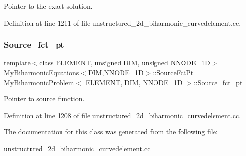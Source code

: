 Pointer to the exact solution. 



Definition at line 1211 of file unstructured\+\_\+2d\+\_\+biharmonic\+\_\+curvedelement.\+cc.

\mbox{\label{classMyBiharmonicProblem_a1ba6c64955d32e319db7a7de7807458a}} 
\subsubsection{\texorpdfstring{Source\+\_\+fct\+\_\+pt}{Source\_fct\_pt}}
{\footnotesize\ttfamily template$<$class E\+L\+E\+M\+E\+NT, unsigned D\+IM, unsigned N\+N\+O\+D\+E\+\_\+1D$>$ \\
\hyperlink{classoomph_1_1MyBiharmonicEquations}{My\+Biharmonic\+Equations}$<$D\+IM,N\+N\+O\+D\+E\+\_\+1D$>$\+::Source\+Fct\+Pt \hyperlink{classMyBiharmonicProblem}{My\+Biharmonic\+Problem}$<$ E\+L\+E\+M\+E\+NT, D\+IM, N\+N\+O\+D\+E\+\_\+1D $>$\+::Source\+\_\+fct\+\_\+pt\hspace{0.3cm}{\ttfamily [private]}}



Pointer to source function. 



Definition at line 1208 of file unstructured\+\_\+2d\+\_\+biharmonic\+\_\+curvedelement.\+cc.



The documentation for this class was generated from the following file\+:\begin{DoxyCompactItemize}
\item 
\hyperlink{unstructured__2d__biharmonic__curvedelement_8cc}{unstructured\+\_\+2d\+\_\+biharmonic\+\_\+curvedelement.\+cc}\end{DoxyCompactItemize}
